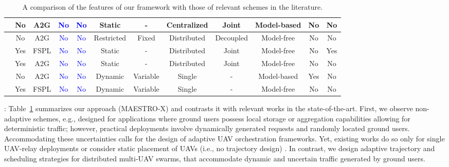 \documentclass[12pt, draftcls, onecolumn]{IEEEtran}
\theoremstyle{plain}
\theoremstyle{definition}
\theoremstyle{remark}
\newcommand\hlt[1]{\textcolor{blue}{#1}}
\begin{document}
\begin{table}
\begin{center}
\begin{tabular}{|*{12}{c|}}
    \hline
    \cite{MultiDroneDeployment} & No & A2G & \hlt{No} & \hlt{No} & Static & - & Centralized & Joint & Model-based & No & No\\
    \hline
    \cite{RLSenseSend} & No & A2G & \hlt{No} & \hlt{No} & Restricted & Fixed & Distributed & Decoupled & Model-free & No & No\\
    \hline
    \cite{DQNPositioning} & Yes & FSPL & \hlt{No} & \hlt{No} & Static & - & Distributed & Joint & Model-free & No & Yes\\
    \hline
    \cite{MLDeployment} & Yes & A2G & \hlt{No} & \hlt{No} & Static & - & Distributed & Joint & Model-free & No & No\\
    \hline
    \cite{Rician} & No & A2G & \hlt{No} & \hlt{No} & Dynamic & Variable & Single & - & Model-based & Yes & No\\
    \hline
    \cite{UAV-DRL} & Yes & FSPL & \hlt{No} & \hlt{No} & Dynamic & Variable & Single & - & Model-free & No & No\\
    \hline
    \end{tabular}
    \vspace{-2mm}
    \caption{A comparison of the features of our framework with those of relevant schemes in the literature.}
    \label{T1}
\end{center}
\vspace{-4mm}
\end{table}

: Table~\ref{T1} summarizes our approach (MAESTRO-X) and contrasts it with relevant works in the state-of-the-art. First, we observe non-adaptive schemes, e.g., \cite{SCA, JointTrajectoryDesign, MultiDroneDeployment} designed for applications where ground users possess local storage or aggregation capabilities allowing for deterministic traffic; however, practical deployments involve dynamically generated requests and randomly located ground users. Accommodating these uncertainties calls for the design of adaptive UAV orchestration frameworks. Yet, existing works do so only for single UAV-relay deployments \cite{UAV-DRL} or consider static placement of UAVs (i.e., no trajectory design) \cite{UAVDynamicCoverage, DQNPositioning, MLDeployment}. In contrast, we design adaptive trajectory and scheduling strategies for distributed multi-UAV swarms, that accommodate dynamic and uncertain traffic generated by ground users.
\end{document}
